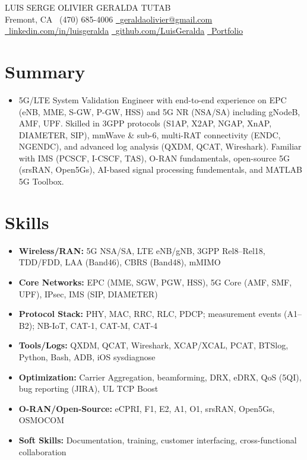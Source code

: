 \documentclass[letterpaper,11pt]{article}
\newcommand{\resumeItem}[1]{\item\small{#1 \vspace{-2pt}}}
\newcommand{\resumeSubHeadingListStart}{\begin{itemize}[leftmargin=0.15in, label={}]}
\newcommand{\resumeSubHeadingListEnd}{\end{itemize}}
\begin{document}
\begin{center}
  {\Huge \scshape LUIS SERGE OLIVIER GERALDA TUTAB}\\
  \vspace{2pt}
  Fremont, CA \quad
  \raisebox{-0.1\height}\faPhone\ (470) 685-4006 \quad
  \href{mailto:geraldaolivier@gmail.com}{\faEnvelope\ \underline{geraldaolivier@gmail.com}} \quad
  \href{https://linkedin.com/in/luisgeralda}{\faLinkedin\ \underline{linkedin.com/in/luisgeralda}} \quad
  \href{https://github.com/LuisGeralda}{\faGithub\ \underline{github.com/LuisGeralda}} \quad
  \href{https://sites.google.com/view/luis-geralda/home}{\faBriefcase\ \underline{Portfolio}}
\end{center}

\section{Summary}
\resumeSubHeadingListStart
\resumeItem{5G/LTE System Validation Engineer with end-to-end experience on EPC (eNB, MME, S-GW, P-GW, HSS) and 5G NR (NSA/SA) including gNodeB, AMF, UPF. Skilled in 3GPP protocols (S1AP, X2AP, NGAP, XnAP, DIAMETER, SIP), mmWave \& sub-6, multi-RAT connectivity (ENDC, NGENDC), and advanced log analysis (QXDM, QCAT, Wireshark). Familiar with IMS (PCSCF, I-CSCF, TAS), O-RAN fundamentals, open-source 5G (srsRAN, Open5Gs), AI-based signal processing fundementals, and MATLAB 5G Toolbox.}
\resumeSubHeadingListEnd

\section{Skills}
\resumeSubHeadingListStart
  \resumeItem{\textbf{Wireless/RAN:} 5G NSA/SA, LTE eNB/gNB, 3GPP Rel8--Rel18, TDD/FDD, LAA (Band46), CBRS (Band48), mMIMO}
  \resumeItem{\textbf{Core Networks:} EPC (MME, SGW, PGW, HSS), 5G Core (AMF, SMF, UPF), IPsec, IMS (SIP, DIAMETER)}
  \resumeItem{\textbf{Protocol Stack:} PHY, MAC, RRC, RLC, PDCP; measurement events (A1--B2); NB-IoT, CAT-1, CAT-M, CAT-4}
  \resumeItem{\textbf{Tools/Logs:} QXDM, QCAT, Wireshark, XCAP/XCAL, PCAT, BTSlog, Python, Bash, ADB, iOS sysdiagnose}
  \resumeItem{\textbf{Optimization:} Carrier Aggregation, beamforming, DRX, eDRX, QoS (5QI), bug reporting (JIRA), UL TCP Boost}
  \resumeItem{\textbf{O-RAN/Open-Source:} eCPRI, F1, E2, A1, O1, srsRAN, Open5Gs, OSMOCOM}
  \resumeItem{\textbf{Soft Skills:} Documentation, training, customer interfacing, cross-functional collaboration}
\resumeSubHeadingListEnd
\end{document}
